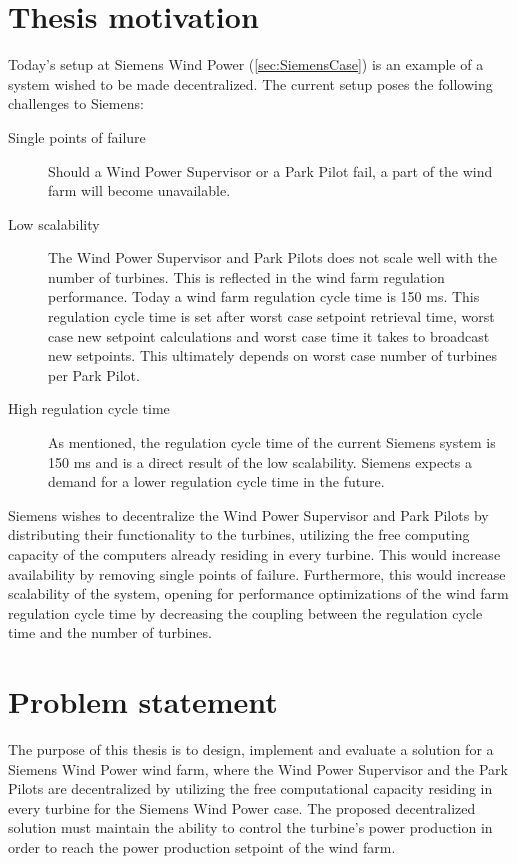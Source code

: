 \section{Thesis motivation}
\label{sec:ThesisMotivation}
Today's setup at Siemens Wind Power (\cref{sec:SiemensCase}) is an example of a system wished to be made decentralized. The current setup poses the following challenges to Siemens:  

\begin{description} 
	\item [Single points of failure] Should a Wind Power Supervisor or a Park Pilot fail, a part of the wind farm will become unavailable.
	\item [Low scalability] The Wind Power Supervisor and Park Pilots does not scale well with the number of turbines. This is reflected in the wind farm regulation performance. Today a wind farm regulation cycle time is 150 ms. This regulation cycle time is set after worst case setpoint retrieval time, worst case new setpoint calculations and worst case time it takes to broadcast new setpoints. This ultimately depends on worst case number of turbines per Park Pilot.
	\item [High regulation cycle time] As mentioned, the regulation cycle time of the current Siemens system is 150 ms and is a direct result of the low scalability. Siemens expects a demand for a lower regulation cycle time in the future.
\end{description}

Siemens wishes to decentralize the Wind Power Supervisor and Park Pilots by distributing their functionality to the turbines, utilizing the free computing capacity of the computers already residing in every turbine. This would increase availability by removing single points of failure. Furthermore, this would increase scalability of the system, opening for performance optimizations of the wind farm regulation cycle time by decreasing the coupling between the regulation cycle time and the number of turbines. 

\section{Problem statement}
\label{sec:problemStatement}

The purpose of this thesis is to design, implement and evaluate a solution for a Siemens Wind Power wind farm, where the Wind Power Supervisor and the Park Pilots are decentralized by utilizing the free computational capacity residing in every turbine for the Siemens Wind Power case. The proposed decentralized solution must maintain the ability to control the turbine's power production in order to reach the power production setpoint of the wind farm. 


